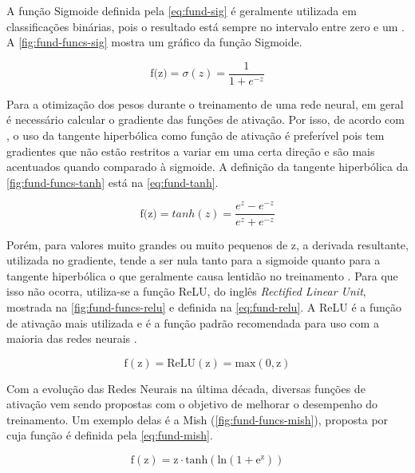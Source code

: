 A função Sigmoide definida pela \autoref{eq:fund-sig}   é geralmente utilizada em classificações binárias, pois o resultado está sempre no intervalo entre zero e um \cite{ref:Ng}. A \autoref{fig:fund-funcs-sig} mostra um gráfico da função Sigmoide.

\begin{equation} \label{eq:fund-sig}
  \text{f(z)} = \sigma(z) = \frac{1}{1 + e^{-z}}
\end{equation}

Para a otimização dos pesos durante o treinamento de uma rede neural, em geral é necessário calcular o gradiente das funções de ativação. Por isso, de acordo com , o uso da tangente hiperbólica como função de ativação é preferível pois tem gradientes que não estão restritos a variar em uma certa direção e são mais acentuados quando comparado à sigmoide. A definição da tangente hiperbólica da \autoref{fig:fund-funcs-tanh} está na \autoref{eq:fund-tanh}.

\begin{equation} \label{eq:fund-tanh}
  \text{f(z)} = tanh(z) = \frac{e^{z} - e^{-z}}{e^{z} + e^{-z}}
\end{equation}

Porém, para valores muito grandes ou muito pequenos de $\mathrm{z}$, a derivada resultante, utilizada no gradiente, tende a ser nula tanto para a sigmoide quanto para a tangente hiperbólica \cite{ref:Ng} o que geralmente causa lentidão no treinamento \cite{ref:Misra}. Para que isso não ocorra, utiliza-se a função ReLU, do inglês \textit{Rectified Linear Unit}, mostrada na \autoref{fig:fund-funcs-relu} e definida na \autoref{eq:fund-relu}. A ReLU é a função de ativação mais utilizada \cite{ref:Ng} e é a função padrão recomendada para uso com a maioria das redes neurais \cite{ref:Goodfellow-Bengio-Courville}.

\begin{equation} \label{eq:fund-relu}
  \mathrm{{f(z)} = ReLU(z) = max(0, z)}
\end{equation}

Com a evolução das Redes Neurais na última década, diversas funções de ativação vem sendo propostas com o objetivo de melhorar o desempenho do treinamento. Um exemplo delas é a Mish (\autoref{fig:fund-funcs-mish}), proposta por  cuja função é definida pela \autoref{eq:fund-mish}.

\begin{equation} \label{eq:fund-mish}
  \mathrm{{f(z)} = z \cdot tanh(ln(1 + e^z))}
\end{equation}


